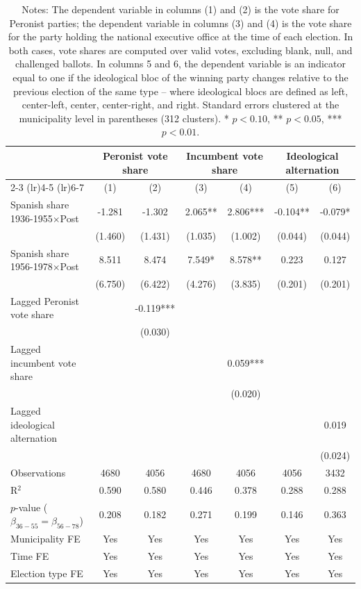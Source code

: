 \begin{table}[!h]
\caption{Effects on Party Alignment and Electoral Competition}
\renewcommand{\arraystretch}{1.25}
\setlength{\tabcolsep}{6pt}
\centering
\begin{tabular}[t]{lcccccc}
\hline
 & \multicolumn{2}{c}{Peronist vote share} & \multicolumn{2}{c}{Incumbent vote share} & \multicolumn{2}{c}{Ideological alternation} \\
\cmidrule(lr){2-3} \cmidrule(lr){4-5} \cmidrule(lr){6-7}
  & (1) & (2) & (3) & (4) & (5) & (6)\\
\hline
Spanish share 1936-1955$\times$Post & -1.281 & -1.302 & 2.065** & 2.806*** & -0.104** & -0.079*\\
 & (1.460) & (1.431) & (1.035) & (1.002) & (0.044) & (0.044)\\
Spanish share 1956-1978$\times$Post & 8.511 & 8.474 & 7.549* & 8.578** & 0.223 & 0.127\\
 & (6.750) & (6.422) & (4.276) & (3.835) & (0.201) & (0.201)\\
Lagged Peronist vote share &  & -0.119*** &  &  &  & \\
 &  & (0.030) &  &  &  & \\
Lagged incumbent vote share &  &  &  & 0.059*** &  & \\
 &  &  &  & (0.020) &  & \\
Lagged ideological alternation &  &  &  &  &  & 0.019\\
 &  &  &  &  &  & (0.024)\\

\addlinespace
Observations & 4680 & 4056 & 4680 & 4056 & 4056 & 3432\\
R$^2$ & 0.590 & 0.580 & 0.446 & 0.378 & 0.288 & 0.288\\
$p$-value ($\beta_{36{-}55} = \beta_{56{-}78}$) & 0.208 & 0.182 & 0.271 & 0.199 & 0.146 & 0.363\\
Municipality FE & Yes & Yes & Yes & Yes & Yes & Yes\\
Time FE & Yes & Yes & Yes & Yes & Yes & Yes\\
Election type FE & Yes & Yes & Yes & Yes & Yes & Yes\\
\hline
\end{tabular}
\vspace{0.3em}
\captionsetup{justification=justified}
\caption*{\footnotesize Notes: The dependent variable in columns (1) and (2) is the vote share for Peronist parties; the dependent variable in columns (3) and (4) is the vote share for the party holding the national executive office at the time of each election. In both cases, vote shares are computed over valid votes, excluding blank, null, and challenged ballots. In columns 5 and 6, the dependent variable is an indicator equal to one if the ideological bloc of the winning party changes relative to the previous election of the same type -- where ideological blocs are defined as left, center-left, center, center-right, and right. Standard errors clustered at the municipality level in parentheses (312 clusters). * $p<0.10$, ** $p<0.05$, *** $p<0.01$.}
\end{table}
